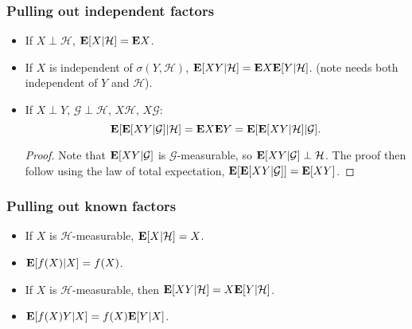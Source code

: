 \documentclass[../main/main.tex]{subfiles}
\begin{document}
\subsubsection{Pulling out independent factors}
\begin{itemize}
	\item If $X\perp \mathcal{H}$, $\text{\textbf{E}}[X|\mathcal{H}] = \text{\textbf{E}} X$.
	\item If $X$ is independent of $\sigma(Y, \mathcal{H})$, $\text{\textbf{E}}[XY | \mathcal{H}] = \text{\textbf{E}} X \text{\textbf{E}} [Y | \mathcal{H}]$. (note needs both independent of $Y$ and $\mathcal{H}$).
	\item If $X \perp Y$, $\mathcal{G} \perp \mathcal{H}$, $X \mathcal{H}$, $X\mathcal{G}$: \[
		      \text{\textbf{E}}[\text{\textbf{E}}[X Y | \mathcal{G}] | \mathcal{H}] = \text{\textbf{E}} X \text{\textbf{E}} Y = \text{\textbf{E}}[\text{\textbf{E}}[XY|\mathcal{H}]|\mathcal{G}].
	      \]
	      \begin{proof}
		      Note that $\text{\textbf{E}}[XY | \mathcal{G}]$ is $\mathcal{G}$-measurable, so $\text{\textbf{E}}[XY|\mathcal{G}] \perp \mathcal{H}$. The proof then follow using the law of total expectation, $\text{\textbf{E}}[\text{\textbf{E}}[XY | \mathcal{G}]] = \text{\textbf{E}}[XY]$.
	      \end{proof}
\end{itemize}
\subsubsection{Pulling out known factors}
\begin{itemize}
	\item If $X$ is $\mathcal{H}$-measurable, $\text{\textbf{E}}[X|\mathcal{H}] = X$.
	\item $\text{\textbf{E}}[f(X) | X] = f(X)$.
	\item If $X$ is $\mathcal{H}$-measurable, then $\text{\textbf{E}}[XY | \mathcal{H}] = X \text{\textbf{E}}[Y | \mathcal{H}]$.
	\item $\text{\textbf{E}}[f(X) Y | X] = f(X) \text{\textbf{E}}[Y | X]$.
\end{itemize}
\end{document}
